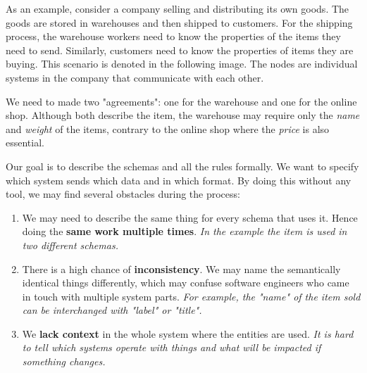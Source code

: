 \begin{showcase}

As an example, consider a company selling and distributing its own goods. The goods are stored in warehouses and then shipped to customers. For the shipping process, the warehouse workers need to know the properties of the items they need to send. Similarly, customers need to know the properties of items they are buying. This scenario is denoted in the following image. The nodes are individual systems in the company that communicate with each other.

\bigskip

\begin{center}
\end{center}

We need to made two "agreements": one for the warehouse and one for the online shop. Although both describe the item, the warehouse may require only the \textit{name} and \textit{weight} of the items, contrary to the online shop where the \textit{price} is also essential.

\end{showcase}

Our goal is to describe the schemas and all the rules formally. We want to specify which system sends which data and in which format. By doing this without any tool, we may find several obstacles during the process:

\begin{enumerate}
    \item We may need to describe the same thing for every schema that uses it. Hence doing the \textbf{same work multiple times}. \textit{In the example the item is used in two different schemas.}
    \item There is a high chance of \textbf{inconsistency}. We may name the semantically identical things differently, which may confuse software engineers who came in touch with multiple system parts. \textit{For example, the "name" of the item sold can be interchanged with "label" or "title".}
    \item We \textbf{lack context} in the whole system where the entities are used. \textit{It is hard to tell which systems operate with things and what will be impacted if something changes.}
\end{enumerate}

